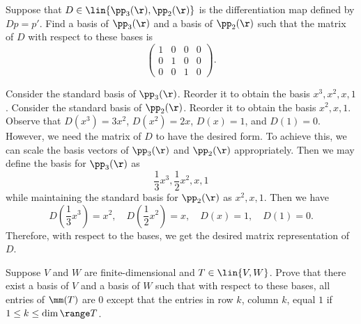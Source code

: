 \begin{exercise}[3c4]
    Suppose that $D \in \lin{\pp_3(\r), \pp_2(\r)}$ is the differentiation map defined by $Dp = p'$. Find a basis of $\pp_3(\r)$ and a basis of $\pp_2(\r)$ such that the matrix of $D$ with respect to these bases is
    \[\begin{pmatrix}
        1 & 0 & 0 & 0 \\
        0 & 1 & 0 & 0 \\
        0 & 0 & 1 & 0
    \end{pmatrix}.\]
\end{exercise}

\begin{sol}
    Consider the standard basis of $\pp_3(\r)$. Reorder it to obtain the basis $x^3, x^2, x, 1$. Consider the standard basis of $\pp_2(\r)$. Reorder it to obtain the basis $x^2, x, 1$. Observe that $D(x^3) = 3x^2$, $D(x^2) = 2x$, $D(x) = 1$, and $D(1) = 0$. However, we need the matrix of $D$ to have the desired form. To achieve this, we can scale the basis vectors of $\pp_3(\r)$ and $\pp_2(\r)$ appropriately. Then we may define the basis for $\pp_3(\r)$ as
    \[\frac 13 x^3, \frac 12 x^2, x, 1\]
    while maintaining the standard basis for $\pp_2(\r)$ as $x^2, x, 1$. Then we have
    \[D\left(\frac 13 x^3\right) = x^2, \quad D\left(\frac 12 x^2\right) = x, \quad D(x) = 1, \quad D(1) = 0.\]
    Therefore, with respect to the bases, we get the desired matrix representation of $D$.
\end{sol}

\begin{exercise}[3c5]
    Suppose $V$ and $W$ are finite-dimensional and $T \in \lin{V, W}$. Prove that there exist a basis of $V$ and a basis of $W$ such that with respect to these bases, all entries of $\mm(T)$ are $0$ except that the entries in row $k$, column $k$, equal $1$ if $1 \leq k \leq \dim \range T$.
\end{exercise}

